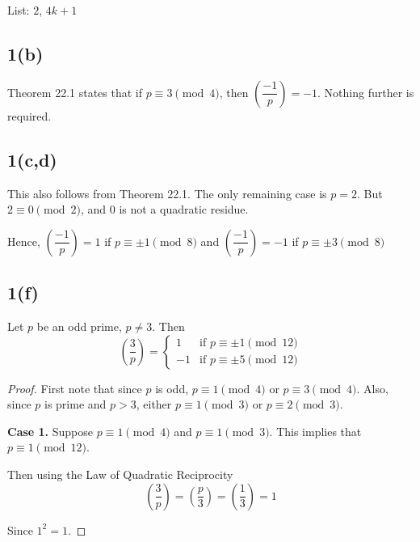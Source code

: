 List: $2$, $4k+1$

\subsection{1(b)}
Theorem 22.1 states that if $p \equiv 3 \pmod 4$, then
$\left( \dfrac{-1}{p} \right)  = -1$. Nothing further is required. 

\subsection{1(c,d)}
This also follows from Theorem 22.1. The only remaining case is $p=2$. But 
$2 \equiv 0 \pmod{2}$, and 0 is not a quadratic residue.

Hence, $\left( \dfrac{-1}{p} \right)  = 1$ if $p \equiv \pm 1 \pmod{8}$
and $\left( \dfrac{-1}{p} \right)  = -1$ if $p \equiv \pm 3 \pmod{8}$

\subsection{1(f)}

\begin{lemma}
Let $p$ be an odd prime, $p \neq 3$. Then
\[
\left( \frac{3}{p} \right) =
\begin{cases}
	1  & \text{if } p \equiv \pm 1 \pmod{12} \\
	-1 & \text{if } p \equiv \pm 5 \pmod{12}
\end{cases}
\]
\end{lemma}
\begin{proof}
First note that since $p$ is odd, $p \equiv 1 \pmod 4$ or $p \equiv 3 \pmod 4$.
Also, since $p$ is prime and $p > 3$, either $p \equiv 1 \pmod 3$ or 
$p \equiv 2 \pmod 3$.

\textbf{Case 1.}
Suppose $p \equiv 1 \pmod 4$ and $p \equiv 1 \pmod 3$. This implies that
$p \equiv 1 \pmod{12}$.

Then using the Law of Quadratic Reciprocity
\[ 
\left( \frac{3}{p} \right) = 
\left( \frac{p}{3} \right) = 
\left( \frac{1}{3} \right) = 1 
\]

Since $1^2 = 1$.


\end{proof}